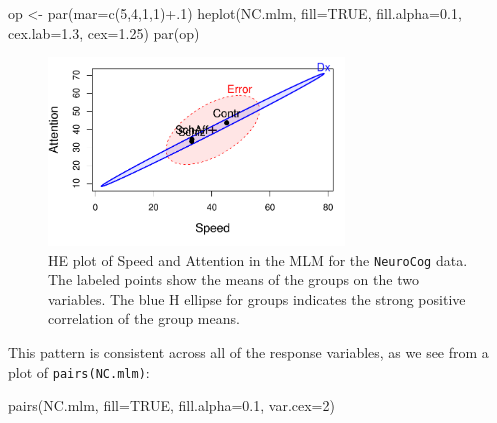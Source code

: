 \documentclass[
  letterpaper,
  10pt,
  krantz2]{krantz}
\makeatletter
\newenvironment{Shaded}{\begin{snugshade}}{\end{snugshade}}
\newcommand{\AttributeTok}[1]{\textcolor[rgb]{0.40,0.45,0.13}{#1}}
\newcommand{\ConstantTok}[1]{\textcolor[rgb]{0.56,0.35,0.01}{#1}}
\newcommand{\DecValTok}[1]{\textcolor[rgb]{0.68,0.00,0.00}{#1}}
\newcommand{\FloatTok}[1]{\textcolor[rgb]{0.68,0.00,0.00}{#1}}
\newcommand{\FunctionTok}[1]{\textcolor[rgb]{0.28,0.35,0.67}{#1}}
\newcommand{\NormalTok}[1]{\textcolor[rgb]{0.00,0.23,0.31}{#1}}
\newcommand{\OtherTok}[1]{\textcolor[rgb]{0.00,0.23,0.31}{#1}}
\newcommand{\SpecialCharTok}[1]{\textcolor[rgb]{0.37,0.37,0.37}{#1}}
\newenvironment{kframe}{%
  \medskip{}
  \setlength{\fboxsep}{.8em}
  \def\at@end@of@kframe{}%
  \ifinner\ifhmode%
  \def\at@end@of@kframe{\end{minipage}}%
  \begin{minipage}{\columnwidth}%
  \fi\fi%
  \def\FrameCommand##1{\hskip\@totalleftmargin \hskip-\fboxsep
  \colorbox{shadecolor}{##1}\hskip-\fboxsep
      \hskip-\linewidth \hskip-\@totalleftmargin \hskip\columnwidth}%
  \MakeFramed {\advance\hsize-\width
    \@totalleftmargin\z@ \linewidth\hsize
    \@setminipage}}%
{\par\unskip\endMakeFramed%
  \at@end@of@kframe}
\renewenvironment{Shaded}{\begin{kframe}}{\end{kframe}}
\makeatother
\begin{document}
\begin{Shaded}
\begin{Highlighting}[]
\NormalTok{op }\OtherTok{\textless{}{-}} \FunctionTok{par}\NormalTok{(}\AttributeTok{mar=}\FunctionTok{c}\NormalTok{(}\DecValTok{5}\NormalTok{,}\DecValTok{4}\NormalTok{,}\DecValTok{1}\NormalTok{,}\DecValTok{1}\NormalTok{)}\SpecialCharTok{+}\NormalTok{.}\DecValTok{1}\NormalTok{)}
\FunctionTok{heplot}\NormalTok{(NC.mlm, }
       \AttributeTok{fill=}\ConstantTok{TRUE}\NormalTok{, }\AttributeTok{fill.alpha=}\FloatTok{0.1}\NormalTok{,}
       \AttributeTok{cex.lab=}\FloatTok{1.3}\NormalTok{, }\AttributeTok{cex=}\FloatTok{1.25}\NormalTok{)}
\FunctionTok{par}\NormalTok{(op)}
\end{Highlighting}
\end{Shaded}

\begin{figure}[H]

{\centering \includegraphics[width=0.7\textwidth,height=\textheight]{figs/fig-NC-HEplot-1.pdf}

}

\caption{\label{fig-NC-HEplot}HE plot of Speed and Attention in the MLM
for the \texttt{NeuroCog} data. The labeled points show the means of the
groups on the two variables. The blue H ellipse for groups indicates the
strong positive correlation of the group means.}

\end{figure}

This pattern is consistent across all of the response variables, as we
see from a plot of \texttt{pairs(NC.mlm)}:

\begin{Shaded}
\begin{Highlighting}[]
\FunctionTok{pairs}\NormalTok{(NC.mlm, }
      \AttributeTok{fill=}\ConstantTok{TRUE}\NormalTok{, }\AttributeTok{fill.alpha=}\FloatTok{0.1}\NormalTok{,}
      \AttributeTok{var.cex=}\DecValTok{2}\NormalTok{)}
\end{Highlighting}
\end{Shaded}
\end{document}

